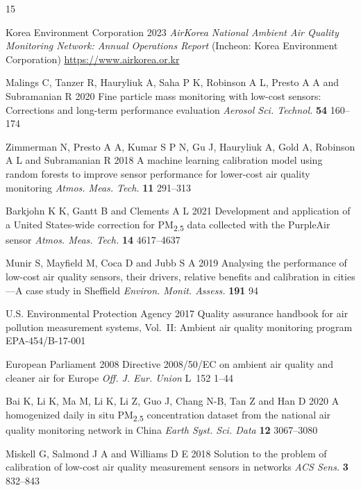 \documentclass[12pt]{article}
\begin{document}
\begin{thebibliography}{15}

Korea Environment Corporation 2023 \textit{AirKorea National Ambient Air Quality Monitoring Network: Annual Operations Report} (Incheon: Korea Environment Corporation) \url{https://www.airkorea.or.kr}

Malings C, Tanzer R, Hauryliuk A, Saha P K, Robinson A L, Presto A A and Subramanian R 2020 Fine particle mass monitoring with low-cost sensors: Corrections and long-term performance evaluation \textit{Aerosol Sci. Technol.} \textbf{54} 160--174

Zimmerman N, Presto A A, Kumar S P N, Gu J, Hauryliuk A, Gold A, Robinson A L and Subramanian R 2018 A machine learning calibration model using random forests to improve sensor performance for lower-cost air quality monitoring \textit{Atmos. Meas. Tech.} \textbf{11} 291--313

Barkjohn K K, Gantt B and Clements A L 2021 Development and application of a United States-wide correction for PM\textsubscript{2.5} data collected with the PurpleAir sensor \textit{Atmos. Meas. Tech.} \textbf{14} 4617--4637

Munir S, Mayfield M, Coca D and Jubb S A 2019 Analysing the performance of low-cost air quality sensors, their drivers, relative benefits and calibration in cities---A case study in Sheffield \textit{Environ. Monit. Assess.} \textbf{191} 94

U.S. Environmental Protection Agency 2017 Quality assurance handbook for air pollution measurement systems, Vol.~II: Ambient air quality monitoring program EPA-454/B-17-001

European Parliament 2008 Directive 2008/50/EC on ambient air quality and cleaner air for Europe \textit{Off. J. Eur. Union} L~152 1--44

Bai K, Li K, Ma M, Li K, Li Z, Guo J, Chang N-B, Tan Z and Han D 2020 A homogenized daily in situ PM\textsubscript{2.5} concentration dataset from the national air quality monitoring network in China \textit{Earth Syst. Sci. Data} \textbf{12} 3067--3080

Miskell G, Salmond J A and Williams D E 2018 Solution to the problem of calibration of low-cost air quality measurement sensors in networks \textit{ACS Sens.} \textbf{3} 832--843


\end{thebibliography}
\end{document}

